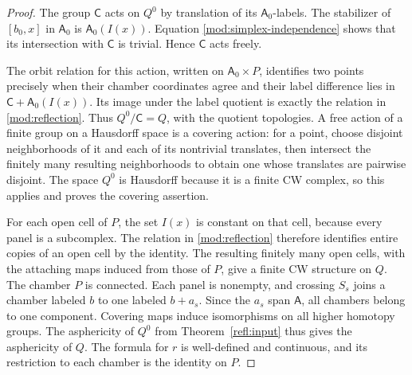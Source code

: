 \begin{proof}
The group \(\mathsf C\) acts on \(Q^0\) by translation of its
\(\mathsf A_0\)-labels.  The stabilizer of \([b_0,x]\) in
\(\mathsf A_0\) is \(\mathsf A_0(I(x))\).  Equation
\eqref{mod:simplex-independence} shows that its intersection with
\(\mathsf C\) is trivial.  Hence \(\mathsf C\) acts freely.

The orbit relation for this action, written on
\(\mathsf A_0\times P\), identifies two points precisely when their
chamber coordinates agree and their label difference lies in
\(\mathsf C+\mathsf A_0(I(x))\).  Its image under the label quotient
is exactly the relation in \eqref{mod:reflection}.  Thus
\(Q^0/\mathsf C=Q\), with the quotient topologies.  A free action of a
finite group on a Hausdorff space is a covering action: for a point,
choose disjoint neighborhoods of it and each of its nontrivial
translates, then intersect the finitely many resulting neighborhoods
to obtain one whose translates are pairwise disjoint.  The space
\(Q^0\) is Hausdorff because it is a finite CW complex, so this applies
and proves the covering assertion.

For each open cell of \(P\), the set \(I(x)\) is constant on that cell,
because every panel is a subcomplex.  The relation in
\eqref{mod:reflection} therefore identifies entire copies of an open
cell by the identity.  The resulting finitely many open cells, with
the attaching maps induced from those of \(P\), give a finite CW
structure on \(Q\).  The chamber \(P\) is connected.  Each panel is
nonempty, and crossing \(S_s\) joins a chamber labeled \(b\) to one
labeled \(b+a_s\).  Since the \(a_s\) span \(\mathsf A\), all chambers
belong to one component.  Covering maps induce isomorphisms on all
higher homotopy groups.  The asphericity of \(Q^0\) from
Theorem~\ref{refl:input} thus gives the asphericity of \(Q\).
The formula for \(r\) is well-defined and continuous, and its
restriction to each chamber is the identity on \(P\).
\end{proof}

